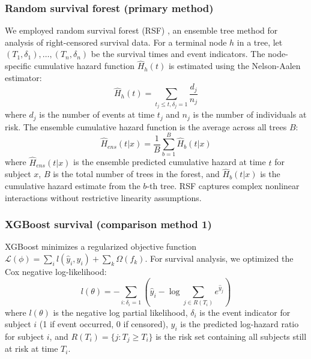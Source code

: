 \documentclass[pdflatex,sn-mathphys-num]{sn-jnl}%
\theoremstyle{thmstyleone}%
\theoremstyle{thmstyletwo}%
\theoremstyle{thmstylethree}%
\begin{document}
\subsubsection{Random survival forest (primary method)}
We employed random survival forest (RSF) \cite{ishwaran2008random}, an ensemble tree method for analysis of right-censored survival data. For a terminal node $h$ in a tree, let $(T_1, \delta_1), \dots, (T_n, \delta_n)$ be the survival times and event indicators. The node-specific cumulative hazard function $\hat{H}_h(t)$ is estimated using the Nelson-Aalen estimator:
\begin{equation}
\hat{H}_h(t) = \sum_{t_j \leq t, \delta_j = 1} \frac{d_j}{n_j}
\end{equation}
where $d_j$ is the number of events at time $t_j$ and $n_j$ is the number of individuals at risk. The ensemble cumulative hazard function is the average across all trees $B$:
\begin{equation}
\hat{H}_{ens}(t|x) = \frac{1}{B} \sum_{b=1}^{B} \hat{H}_b(t|x)
\end{equation}
where $\hat{H}_{ens}(t|x)$ is the ensemble predicted cumulative hazard at time $t$ for subject $x$, $B$ is the total number of trees in the forest, and $\hat{H}_b(t|x)$ is the cumulative hazard estimate from the $b$-th tree.
RSF captures complex nonlinear interactions without restrictive linearity assumptions.

\subsubsection{XGBoost survival (comparison method 1)}
XGBoost \cite{chen2016xgboost} minimizes a regularized objective function $\mathcal{L}(\phi) = \sum_{i} l(\hat{y}_i, y_i) + \sum_{k} \Omega(f_k)$. For survival analysis, we optimized the Cox negative log-likelihood:
\begin{equation}
l(\theta) = -\sum_{i: \delta_i=1} \left( \hat{y}_i - \log \sum_{j \in R(T_i)} e^{\hat{y}_j} \right)
\end{equation}
where $l(\theta)$ is the negative log partial likelihood, $\delta_i$ is the event indicator for subject $i$ (1 if event occurred, 0 if censored), $\hat{y}_i$ is the predicted log-hazard ratio for subject $i$, and $R(T_i) = \{j : T_j \geq T_i\}$ is the risk set containing all subjects still at risk at time $T_i$.
\end{document}
